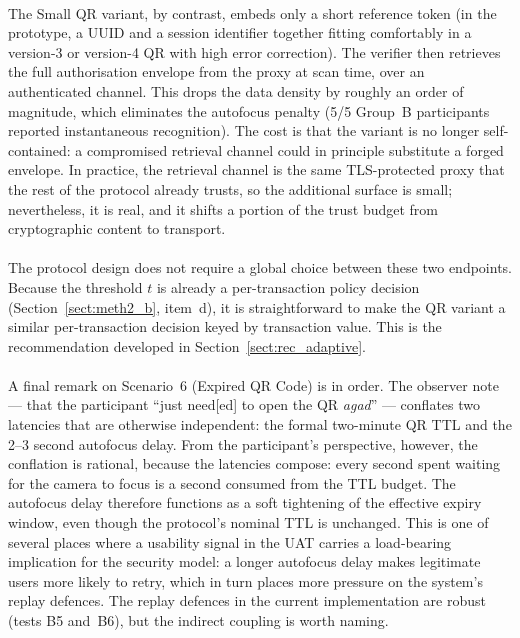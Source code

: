 \paragraph{}The Small QR variant, by contrast, embeds only a short reference token (in the prototype, a UUID and a session identifier together fitting comfortably in a version-3 or version-4 QR with high error correction). The verifier then retrieves the full authorisation envelope from the proxy at scan time, over an authenticated channel. This drops the data density by roughly an order of magnitude, which eliminates the autofocus penalty (5/5 Group~B participants reported instantaneous recognition). The cost is that the variant is no longer self-contained: a compromised retrieval channel could in principle substitute a forged envelope. In practice, the retrieval channel is the same TLS-protected proxy that the rest of the protocol already trusts, so the additional surface is small; nevertheless, it is real, and it shifts a portion of the trust budget from cryptographic content to transport.

\paragraph{}The protocol design does not require a global choice between these two endpoints. Because the threshold $t$ is already a per-transaction policy decision (Section~\ref{sect:meth2_b}, item~d), it is straightforward to make the QR variant a similar per-transaction decision keyed by transaction value. This is the recommendation developed in Section~\ref{sect:rec_adaptive}.

\paragraph{}A final remark on Scenario~6 (Expired QR Code) is in order. The observer note --- that the participant ``just need[ed] to open the QR \textit{agad}'' --- conflates two latencies that are otherwise independent: the formal two-minute QR TTL and the 2--3 second autofocus delay. From the participant's perspective, however, the conflation is rational, because the latencies compose: every second spent waiting for the camera to focus is a second consumed from the TTL budget. The autofocus delay therefore functions as a soft tightening of the effective expiry window, even though the protocol's nominal TTL is unchanged. This is one of several places where a usability signal in the UAT carries a load-bearing implication for the security model: a longer autofocus delay makes legitimate users more likely to retry, which in turn places more pressure on the system's replay defences. The replay defences in the current implementation are robust (tests B5 and~B6), but the indirect coupling is worth naming.

